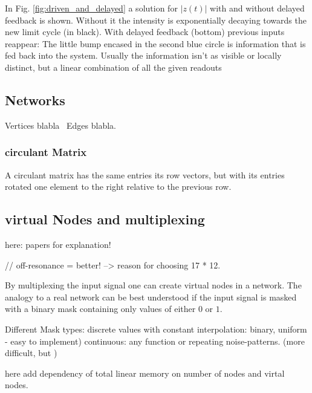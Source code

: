 In Fig. \ref{fig:driven_and_delayed} a solution for $|z(t)|$ with and without delayed feedback is shown. Without it the intensity is exponentially decaying towards the new limit cycle (in black). With delayed feedback (bottom) previous inputs reappear: The little bump encased in the second blue circle is information that is fed back into the system. Usually the information isn't as visible or locally distinct, but a linear combination of all the given readouts 



\subsection{Networks}

Vertices blabla \
Edges blabla. \

	\subsubsection{circulant Matrix}
    A circulant matrix has the same entries its row vectors, but with its entries rotated one element to the right relative to the previous row.

    
\subsection{virtual Nodes and multiplexing}
	here: papers for explanation! 
	\cite{KUR18}
	
	\cite{STE20} // off-resonance = better! --> reason for choosing 17 * 12.
	
	By multiplexing the input signal one can create virtual nodes in a network. The analogy to a real network can be best understood if the input signal is masked with a binary mask containing only values of either $0$ or $1$. 
	
	Different Mask types: discrete values with constant interpolation: binary, uniform - easy to implement)
	continuous: any function or repeating noise-patterns. (more difficult, but )

	
	here add dependency of total linear memory on number of nodes and virtal nodes.

